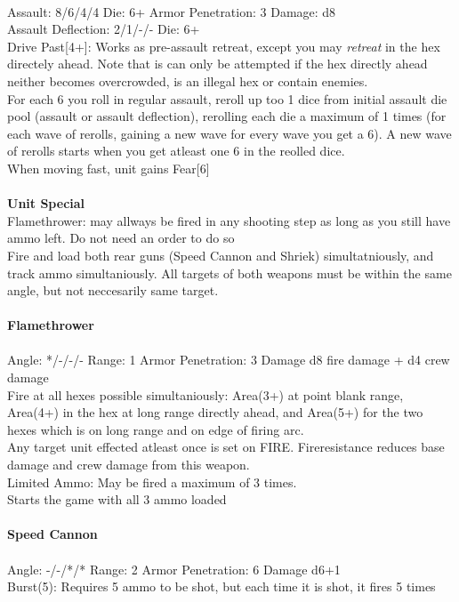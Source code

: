 \ \\
Assault: 8/6/4/4 Die: 6+ Armor Penetration: 3 Damage: d8 \\
Assault Deflection: 2/1/-/- Die: 6+\\
\indent Drive Past[4+]: Works as pre-assault retreat, except you may {\it retreat} in the hex directely ahead. Note that is can only be attempted if the hex directly ahead neither becomes overcrowded, is an illegal hex or contain enemies. \\ For each 6 you roll in regular assault, reroll up too 1 dice from initial assault die pool (assault or assault deflection), rerolling each die a maximum of 1 times (for each wave of rerolls, gaining a new wave for every wave you get a 6). A new wave of rerolls starts when you get atleast one 6 in the reolled dice. \\ When moving fast, unit gains Fear[6] \\
\ \\

{\bf Unit Special} \\
Flamethrower: may allways be fired in any shooting step as long as you still have ammo left. Do not need an order to do so \\ Fire and load both rear guns (Speed Cannon and Shriek) simultatniously, and track ammo simultaniously. All targets of both weapons must be within the same angle, but not neccesarily same target.
\ \\
\ \\
{\bf Flamethrower } \\
\ \\
Angle: */-/-/- Range: 1 Armor Penetration: 3 Damage d8 fire damage + d4 crew damage \\
\indent Fire at all hexes possible simultaniously: Area(3+) at point blank range, Area(4+) in the hex at long range directly ahead, and Area(5+) for the two hexes which is on long range and on edge of firing arc. \\ Any target unit effected atleast once is set on FIRE. Fireresistance reduces base damage and crew damage from this weapon. \\ Limited Ammo: May be fired a maximum of 3 times. \\ Starts the game with all 3 ammo loaded \\



\ \\
{\bf Speed Cannon } \\
\ \\
Angle: -/-/*/* Range: 2 Armor Penetration: 6 Damage d6+1 \\
\indent Burst(5): Requires 5 ammo to be shot, but each time it is shot, it fires 5 times \\



